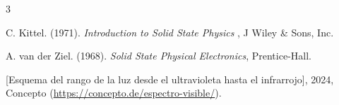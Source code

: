 \begin{thebibliography}{3}

C. Kittel. (1971). \textit{Introduction to Solid State Physics} , J Wiley \& Sons, Inc.

A. van der Ziel. (1968). \textit{Solid State Physical Electronics}, Prentice-Hall.

[Esquema del rango de la luz desde el ultravioleta hasta el infrarrojo], 2024, Concepto (\url{https://concepto.de/espectro-visible/}).

\end{thebibliography}
